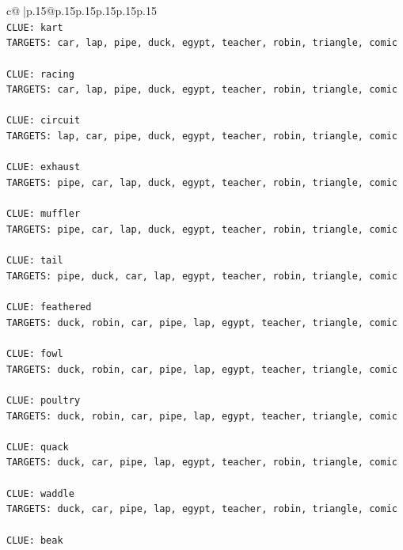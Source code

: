 \documentclass{article}
\begin{document}
{\begin{supertabular}{c@{$\;$}|p{.15\linewidth}@{}p{.15\linewidth}p{.15\linewidth}p{.15\linewidth}p{.15\linewidth}p{.15\linewidth}}
{{{\\ 
\texttt{CLUE: kart} \\
\texttt{TARGETS: car, lap, pipe, duck, egypt, teacher, robin, triangle, comic} \\
\\ 
\texttt{CLUE: racing} \\
\texttt{TARGETS: car, lap, pipe, duck, egypt, teacher, robin, triangle, comic} \\
\\ 
\texttt{CLUE: circuit} \\
\texttt{TARGETS: lap, car, pipe, duck, egypt, teacher, robin, triangle, comic} \\
\\ 
\texttt{CLUE: exhaust} \\
\texttt{TARGETS: pipe, car, lap, duck, egypt, teacher, robin, triangle, comic} \\
\\ 
\texttt{CLUE: muffler} \\
\texttt{TARGETS: pipe, car, lap, duck, egypt, teacher, robin, triangle, comic} \\
\\ 
\texttt{CLUE: tail} \\
\texttt{TARGETS: pipe, duck, car, lap, egypt, teacher, robin, triangle, comic} \\
\\ 
\texttt{CLUE: feathered} \\
\texttt{TARGETS: duck, robin, car, pipe, lap, egypt, teacher, triangle, comic} \\
\\ 
\texttt{CLUE: fowl} \\
\texttt{TARGETS: duck, robin, car, pipe, lap, egypt, teacher, triangle, comic} \\
\\ 
\texttt{CLUE: poultry} \\
\texttt{TARGETS: duck, robin, car, pipe, lap, egypt, teacher, triangle, comic} \\
\\ 
\texttt{CLUE: quack} \\
\texttt{TARGETS: duck, car, pipe, lap, egypt, teacher, robin, triangle, comic} \\
\\ 
\texttt{CLUE: waddle} \\
\texttt{TARGETS: duck, car, pipe, lap, egypt, teacher, robin, triangle, comic} \\
\\ 
\texttt{CLUE: beak} \\
}}}
\end{supertabular}}
\end{document}
